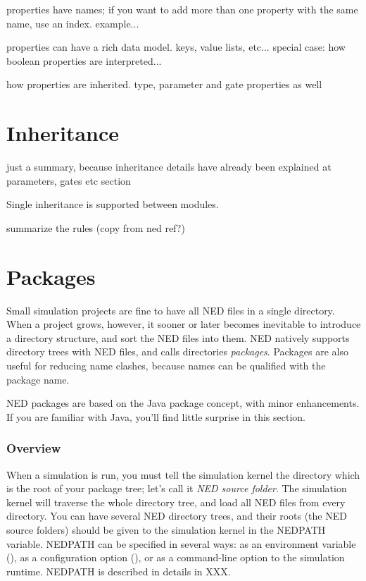 properties have names; if you want to add more than one property with the
same name, use an index.  example...

properties can have a rich data model. keys, value lists, etc...
special case: how boolean properties are interpreted...

how properties are inherited. type, parameter and gate properties as well



\section{Inheritance}
\label{sec:ch-ned-lang:inheritance}

just a summary, because inheritance details have already been explained
at parameters, gates etc section

Single inheritance is supported between modules.

summarize the rules (copy from ned ref?)



\section{Packages}

Small simulation projects are fine to have all NED files in a single
directory. When a project grows, however, it sooner or later becomes
inevitable to introduce a directory structure, and sort the NED files into
them. NED natively supports directory trees with NED files, and calls
directories \textit{packages}. Packages are also useful for reducing
name clashes, because names can be qualified with the package name.

\begin{note}
    NED packages are based on the Java package concept, with minor
    enhancements. If you are familiar with Java, you'll find little
    surprise in this section.
\end{note}

\subsubsection{Overview}

When a simulation is run, you must tell the simulation kernel the
directory which is the root of your package tree; let's call it
\textit{NED source folder}. The simulation kernel will traverse
the whole directory tree, and load all NED files from every directory.
You can have several NED directory trees, and their roots (the NED source
folders) should be given to the simulation kernel in the NEDPATH
variable. NEDPATH can be specified in several ways: as an environment
variable (), as a configuration option (),
or as a command-line option to the simulation runtime. NEDPATH is
described in details in XXX.

